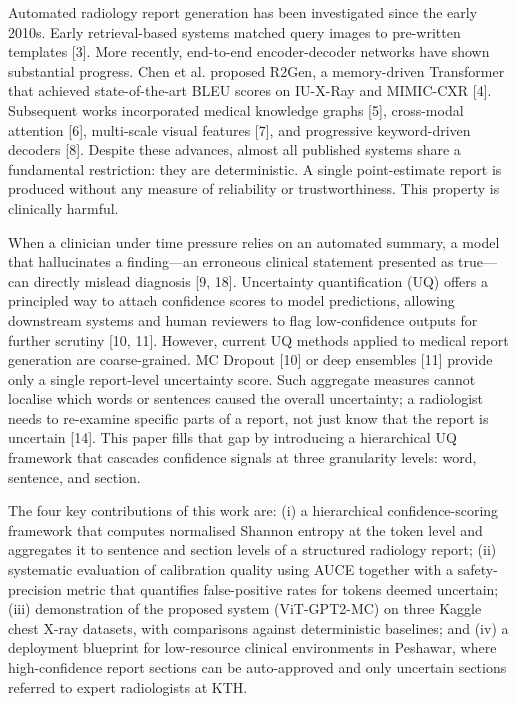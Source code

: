 \documentclass{jcst}
\begin{document}
Automated radiology report generation has been investigated since the early 2010s. Early retrieval-based systems matched query images to pre-written templates [3]. More recently, end-to-end encoder-decoder networks have shown substantial progress. Chen et al. proposed R2Gen, a memory-driven Transformer that achieved state-of-the-art BLEU scores on IU-X-Ray and MIMIC-CXR [4]. Subsequent works incorporated medical knowledge graphs [5], cross-modal attention [6], multi-scale visual features [7], and progressive keyword-driven decoders [8]. Despite these advances, almost all published systems share a fundamental restriction: they are deterministic. A single point-estimate report is produced without any measure of reliability or trustworthiness. This property is clinically harmful.

When a clinician under time pressure relies on an automated summary, a model that hallucinates a finding—an erroneous clinical statement presented as true—can directly mislead diagnosis [9, 18]. Uncertainty quantification (UQ) offers a principled way to attach confidence scores to model predictions, allowing downstream systems and human reviewers to flag low-confidence outputs for further scrutiny [10, 11]. However, current UQ methods applied to medical report generation are coarse-grained. MC Dropout [10] or deep ensembles [11] provide only a single report-level uncertainty score. Such aggregate measures cannot localise which words or sentences caused the overall uncertainty; a radiologist needs to re-examine specific parts of a report, not just know that the report is uncertain [14]. This paper fills that gap by introducing a hierarchical UQ framework that cascades confidence signals at three granularity levels: word, sentence, and section.

The four key contributions of this work are: (i) a hierarchical confidence-scoring framework that computes normalised Shannon entropy at the token level and aggregates it to sentence and section levels of a structured radiology report; (ii) systematic evaluation of calibration quality using AUCE together with a safety-precision metric that quantifies false-positive rates for tokens deemed uncertain; (iii) demonstration of the proposed system (ViT-GPT2-MC) on three Kaggle chest X-ray datasets, with comparisons against deterministic baselines; and (iv) a deployment blueprint for low-resource clinical environments in Peshawar, where high-confidence report sections can be auto-approved and only uncertain sections referred to expert radiologists at KTH.
\end{document}
